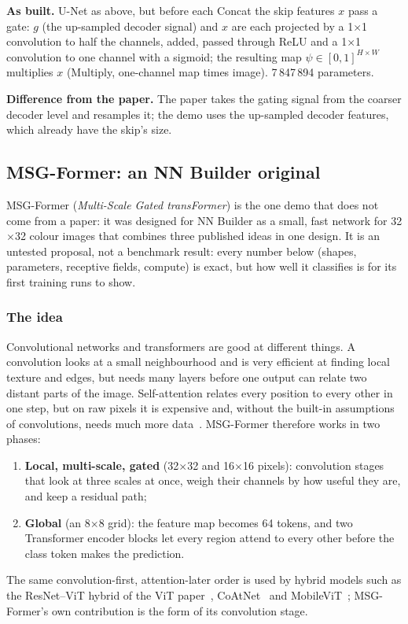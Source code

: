 \documentclass[11pt,a4paper]{article}
\begin{document}
\textbf{As built.} U-Net as above, but before each Concat the skip features $x$ pass a gate: $g$ (the up-sampled decoder signal) and $x$
are each projected by a 1$\times$1 convolution to half the channels, added, passed through ReLU and a 1$\times$1 convolution to one channel
with a sigmoid; the resulting map $\psi\in[0,1]^{H\times W}$ multiplies $x$ (Multiply, one-channel map times image). 7\,847\,894 parameters.

\textbf{Difference from the paper.} The paper takes the gating signal from the coarser decoder level and resamples it; the demo uses the
up-sampled decoder features, which already have the skip's size.

\subsection{MSG-Former: an NN Builder original}
\label{sec:msg}

MSG-Former (\emph{Multi-Scale Gated transFormer}) is the one demo that does not come from a paper: it was designed for NN Builder as a
small, fast network for 32$\times$32 colour images that combines three published ideas in one design. It is an untested proposal, not a
benchmark result: every number below (shapes, parameters, receptive fields, compute) is exact, but how well it classifies is for its
first training runs to show.

\subsubsection{The idea}
Convolutional networks and transformers are good at different things. A convolution looks at a small neighbourhood and is very efficient
at finding local texture and edges, but needs many layers before one output can relate two distant parts of the image. Self-attention
relates every position to every other in one step, but on raw pixels it is expensive and, without the built-in assumptions of
convolutions, needs much more data~\cite{dosovitskiy2020vit,touvron2020deit}. MSG-Former therefore works in two phases:
\begin{enumerate}
  \item \textbf{Local, multi-scale, gated} (32$\times$32 and 16$\times$16 pixels): convolution stages that look at three scales at once,
        weigh their channels by how useful they are, and keep a residual path;
  \item \textbf{Global} (an 8$\times$8 grid): the feature map becomes 64 tokens, and two Transformer encoder blocks let every region
        attend to every other before the class token makes the prediction.
\end{enumerate}
The same convolution-first, attention-later order is used by hybrid models such as the ResNet--ViT hybrid of the ViT
paper~\cite{dosovitskiy2020vit}, CoAtNet~\cite{dai2021coatnet} and MobileViT~\cite{mehta2021mobilevit}; MSG-Former's own contribution is the
form of its convolution stage.
\end{document}
